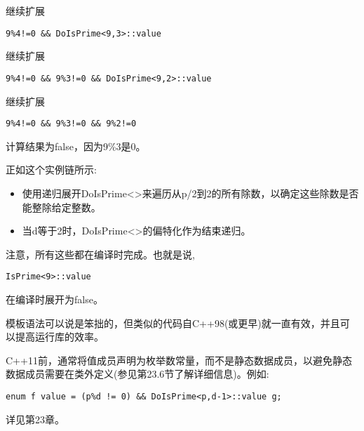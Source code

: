 继续扩展

\begin{lstlisting}[style=styleCXX]
9%4!=0 && DoIsPrime<9,3>::value
\end{lstlisting}

继续扩展

\begin{lstlisting}[style=styleCXX]
9%4!=0 && 9%3!=0 && DoIsPrime<9,2>::value
\end{lstlisting}

继续扩展

\begin{lstlisting}[style=styleCXX]
9%4!=0 && 9%3!=0 && 9%2!=0
\end{lstlisting}

计算结果为false，因为9\%3是0。

正如这个实例链所示:

\begin{itemize}
\item 
使用递归展开DoIsPrime<>来遍历从p/2到2的所有除数，以确定这些除数是否能整除给定整数。

\item 
当d等于2时，DoIsPrime<>的偏特化作为结束递归。
\end{itemize}

注意，所有这些都在编译时完成。也就是说,

\begin{lstlisting}[style=styleCXX]
IsPrime<9>::value
\end{lstlisting}

在编译时展开为false。

模板语法可以说是笨拙的，但类似的代码自C++98(或更早)就一直有效，并且可以提高运行库的效率。

\begin{tcolorbox}[colback=webgreen!5!white,colframe=webgreen!75!black]
\hspace*{0.75cm}C++11前，通常将值成员声明为枚举数常量，而不是静态数据成员，以避免静态数据成员需要在类外定义(参见第23.6节了解详细信息)。例如:
\begin{lstlisting}[style=styleCXX]
enum f value = (p%d != 0) && DoIsPrime<p,d-1>::value g;
\end{lstlisting}
\end{tcolorbox}

详见第23章。


























